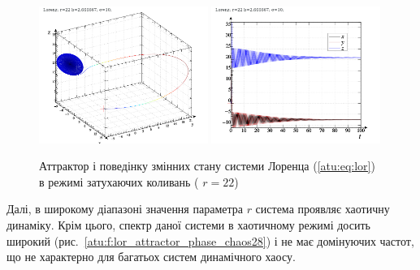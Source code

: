 \begin{figure}[ht!]
\begin{center}
  \includegraphics[width=0.49\textwidth]{p/cha/lor/lor0-p_xyz_r=022.png}
  \hfill
  \includegraphics[width=0.49\textwidth]{p/cha/lor/lor0-p_t_r=022.png}
\end{center}
\caption{Аттрактор і поведінку змінних стану системи Лоренца (\ref{atu:eq:lor}) в режимі затухаючих коливань ( $ r = 22 $)}
\label{atu:f:lor_attractor_fading}
\end{figure}

Далі, в широкому діапазоні значення параметра $r$ система проявляє хаотичну
динаміку. Крім цього, спектр даної системи в хаотичному режимі досить широкий
(рис.~\ref{atu:f:lor_attractor_phase_chaos28}) і не має домінуючих
частот, що не характерно для багатьох систем динамічного хаосу.

